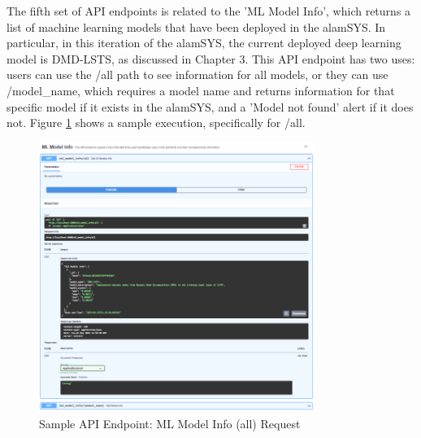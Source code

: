 The fifth set of API endpoints is related to the 'ML Model Info', 
which returns a list of machine learning models that have been deployed in 
the alamSYS. In particular, in this iteration of the alamSYS, the current 
deployed deep learning model is DMD-LSTS, as discussed in Chapter 3. 
This API endpoint has two uses: users can use the /all path 
to see information for all models, or they can use /model\_name, which requires 
a model name and returns information for that specific model if it exists in 
the alamSYS, and a 'Model not found' alert if it does not. Figure 
\ref{fig:alamAPI_ml} shows a sample execution, specifically for /all.
\begin{figure}[ht]
    \centering
    \includegraphics[width=0.80\textwidth]{./assets/Chapter_4/Documentation/alamAPI_ml.png}
    \caption{Sample API Endpoint: ML Model Info (all) Request}
    \label{fig:alamAPI_ml}
\end{figure}
\FloatBarrier


